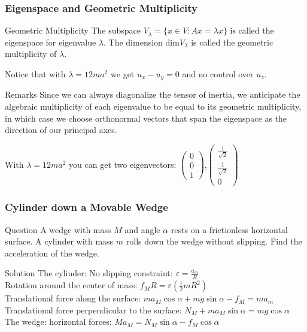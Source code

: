 \begin{frame}
\frametitle{Eigenspace and Geometric Multiplicity}
\begin{block}{Geometric Multiplicity}
The subspace $V_{\lambda}=\{x\in V: Ax=\lambda x\}$ is called the \alert{eigenspace} for eigenvalue $\lambda$. The dimension $\mathrm{dim}V_{\lambda}$ is called the \alert{geometric multiplicity} of $\lambda$.
\end{block}
Notice that with $\lambda=12ma^2$ we get $u_x-u_y=0$ and no control over $u_z$.
\begin{block}{Remarks}
Since we can always diagonalize the tensor of inertia, we anticipate the \alert{algebraic multiplicity} of each eigenvalue to be equal to its \alert{geometric multiplicity}, in which case we choose \alert{orthonormal vectors} that span the eigenspace as the \alert{direction} of our \alert{principal axes}.
\end{block}
With $\lambda=12ma^2$ you can get two eigenvectors: $\left(\begin{matrix}0\\0\\1\end{matrix}\right)$,$\left(\begin{matrix}\frac{1}{\sqrt{2}}\\\frac{1}{\sqrt{2}}\\0\end{matrix}\right)$
\end{frame}
\begin{frame}
\frametitle{Cylinder down a Movable Wedge}
\begin{block}{Question}
A wedge with mass $M$ and angle $\alpha$ rests on a \alert{frictionless} horizontal surface. A cylinder with mass $m$ rolls down the wedge \alert{without slipping}. Find the \alert{acceleration} of the wedge.
\end{block}
\begin{block}{Solution}
The cylinder:
No slipping \alert{constraint}: $\varepsilon=\frac{a_m}{R}$\\
\alert{Rotation} around the center of mass: $f_{M}R=\varepsilon(\frac{1}{2}mR^2)$\\
Translational force \alert{along} the surface: $ma_M\cos\alpha+mg\sin\alpha-f_M=ma_m$\\
Translational force \alert{perpendicular} to the surface: $N_M+ma_M\sin\alpha=mg\cos\alpha$\\
The wedge: \alert{horizontal} forces: $Ma_M=N_M\sin\alpha-f_M\cos\alpha$
\end{block}
\end{frame}
